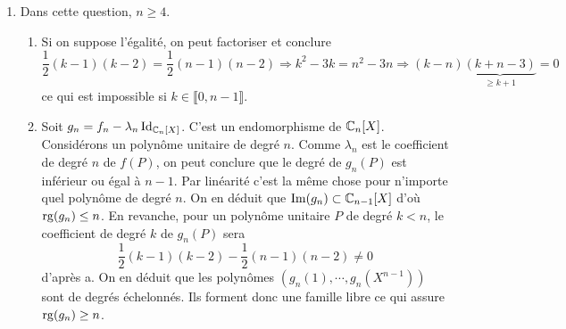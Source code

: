 \begin{enumerate}
  \item Dans cette question, $n\geq 4$.
\begin{enumerate}
  \item Si on suppose l'égalité, on peut factoriser et conclure
\begin{displaymath}
\frac{1}{2}(k-1)(k-2)=  \frac{1}{2}(n-1)(n-2)
\Rightarrow k^2 - 3k = n^2-3n \Rightarrow (k-n)\underset{\geq k+1}{\underbrace{(k+n-3)}}=0
\end{displaymath}
ce qui est impossible si $k\in \llbracket 0, n-1 \rrbracket$.
  \item Soit $g_n = f_n - \lambda_n \operatorname{Id}_{\mathbb{C}_n[X]}$. C'est un endomorphisme de $\mathbb{C}_n[X]$.\newline
Considérons un polynôme unitaire de degré $n$. Comme $\lambda_n$ est le coefficient de degré $n$ de $f(P)$, on peut conclure que le degré de $g_n(P)$ est inférieur ou égal à $n-1$. Par linéarité c'est la même chose pour n'importe quel polynôme de degré $n$. On en déduit que $\operatorname{Im}(g_n)\subset \mathbb{C}_{n-1}[X]$ d'où $\operatorname{rg}(g_n)\leq n$.\newline
En revanche, pour un polynôme unitaire $P$ de degré $k<n$, le coefficient de degré $k$ de $g_n(P)$ sera
\begin{displaymath}
\frac{1}{2}(k-1)(k-2)-\frac{1}{2}(n-1)(n-2) \neq 0 
\end{displaymath}
d'après a. On en déduit que les polynômes $(g_n(1),\cdots,g_n(X^{n-1}))$ sont de degrés échelonnés. Ils forment donc une famille libre ce qui assure $\operatorname{rg}(g_n)\geq n$.
\end{enumerate}


\end{enumerate}

